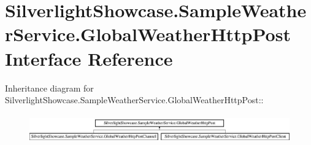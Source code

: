 \hypertarget{interface_silverlight_showcase_1_1_sample_weather_service_1_1_global_weather_http_post}{
\section{SilverlightShowcase.SampleWeatherService.GlobalWeatherHttpPost Interface Reference}
\label{interface_silverlight_showcase_1_1_sample_weather_service_1_1_global_weather_http_post}
}
Inheritance diagram for SilverlightShowcase.SampleWeatherService.GlobalWeatherHttpPost::\begin{figure}[H]
\begin{center}
\leavevmode
\includegraphics[height=1.24444cm]{interface_silverlight_showcase_1_1_sample_weather_service_1_1_global_weather_http_post}
\end{center}
\end{figure}
